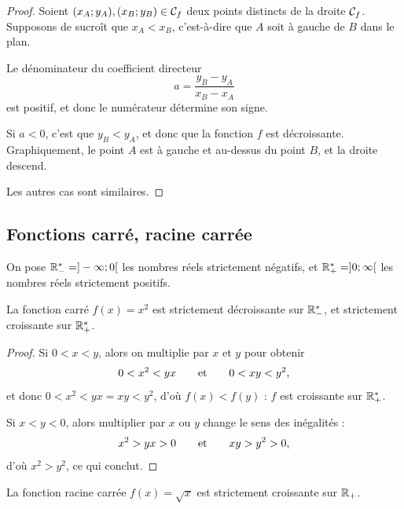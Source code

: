 \documentclass[a4paper, 12pt]{report}
\begin{document}
\begin{proof}
	Soient $(x_A;y_A), (x_B; y_B) \in \mathcal{C}_f$ deux points distincts de la droite $\mathcal{C}_f$.
	Supposons de sucroît que $x_A < x_B$, c'est-à-dire que $A$ soit à gauche de $B$ dans le plan.
	
	Le dénominateur du coefficient directeur
		\[ a = \dfrac{y_B - y_A}{x_B-x_A} \]
	 est positif, et donc le numérateur détermine son signe.
	 
	 Si $a<0$, c'est que $y_B < y_A$, et donc que la fonction $f$ est décroissante.
	 Graphiquement, le point $A$ est à gauche et au-dessus du point $B$, et la droite descend.
	 
	 Les autres cas sont similaires.
\end{proof}

\subsection{Fonctions carré, racine carrée}

\begin{nota}
	On pose $\mathbb{R}_-^* = ]-\infty ; 0[$ les nombres réels strictement négatifs, et $\mathbb{R}_+^* = ]0 ; \infty[$ 
	les nombres réels strictement positifs.
\end{nota}

\begin{thm}
	La fonction carré $f(x) = x^2$ est strictement décroissante sur $\mathbb{R}_-^*$, et strictement croissante sur $\mathbb{R}_+^*$.
\end{thm}

\begin{proof}
	Si $0 < x < y$, alors on multiplie par $x$ et $y$ pour obtenir
		\begin{align*}
			0 < x^2 < yx && \quad \text{et} \quad && 0 < xy < y^2,
		\end{align*}
	et donc $0 < x^2 < yx = xy < y^2$, d'où $f(x) < f(y)$ : $f$ est croissante sur $\mathbb{R}_+^*$.
	
	Si $x < y < 0$, alors multiplier par $x$ ou $y$ change le sens des inégalités :
		\begin{align*}
			x^2 > yx > 0 && \quad \text{et} \quad && xy > y^2 > 0,
		\end{align*}
	d'où $x^2 > y^2$, ce qui conclut.
\end{proof}

\begin{thm}
	La fonction racine carrée $f(x) = \sqrt{x}$ est strictement croissante sur $\mathbb{R}_+$.
\end{thm}
\end{document}
